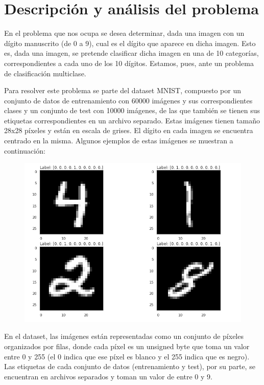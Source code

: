 \documentclass[a4paper,11pt]{article}
\begin{document}

%

\tableofcontents

\newpage

\section{Descripción y análisis del problema}
En el problema que nos ocupa se desea determinar, dada una imagen con un dígito manuscrito (de 0 a 9), cual es el dígito que aparece en dicha imagen. Esto es, dada una imagen, se pretende clasificar dicha imagen en una de 10 categorías, correspondientes a cada uno de los 10 dígitos. Estamos, pues, ante un problema de clasificación multiclase.  

Para resolver este problema se parte del dataset MNIST, compuesto por un conjunto de datos de entrenamiento con 60000 imágenes y sus correspondientes clases y un conjunto de test con 10000 imágenes, de las que también se tienen sus etiquetas correspondientes en un archivo separado. Estas imágenes tienen tamaño 28x28 píxeles y están en escala de grises. El dígito en cada imagen se encuentra centrado en la misma. Algunos ejemplos de estas imágenes se muestran a continuación:

\begin{figure}[H]
	\centering
	\includegraphics[width=0.8\linewidth]{img/mnist}
	\caption{}
	\label{fig:mnist}
\end{figure}

En el dataset, las imágenes están representadas como un conjunto de píxeles organizados por filas, donde cada píxel es un unsigned byte que toma un valor entre 0 y 255 (el 0 indica que ese píxel es blanco y el 255 indica que es negro). Las etiquetas de cada conjunto de datos (entrenamiento y test), por su parte, se encuentran en archivos separados y toman un valor de entre 0 y 9.
\end{document}
